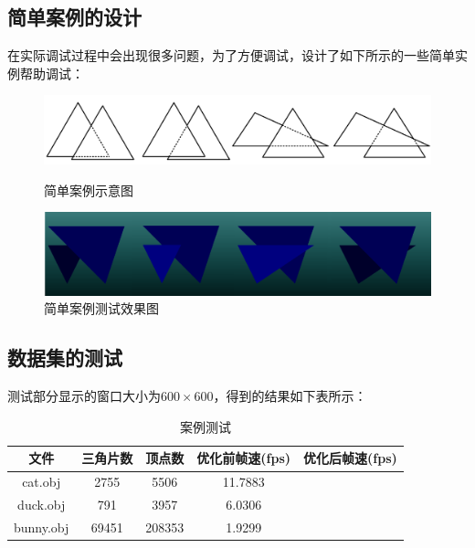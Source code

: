 \documentclass[10pt]{article}
\begin{document}
\subsection{简单案例的设计}
在实际调试过程中会出现很多问题，为了方便调试，设计了如下所示的一些简单实例帮助调试：
\begin{figure}[H]
\setlength{\abovecaptionskip}{2pt}
\setlength{\belowcaptionskip}{20pt}
\begin{center}
\includegraphics[scale=0.6]{cases1.png}
\caption{简单案例示意图}
\includegraphics[scale=0.5]{cases2.png}
\caption{简单案例测试效果图}
\end{center}
\end{figure}

\subsection{数据集的测试}
测试部分显示的窗口大小为$600\times600$，得到的结果如下表所示：
\begin{table}[H]
\caption{案例测试}
\begin{center}
\begin{tabular}{ccccc}
\toprule  %
文件&三角片数&顶点数&优化前帧速(fps)&优化后帧速(fps)\\
\midrule  %
cat.obj&2755&5506&11.7883& \\
duck.obj&791&3957& 6.0306&\\
bunny.obj&69451&208353&1.9299&\\
\bottomrule %
\end{tabular}
\end{center}
\end{table}
\end{document}
